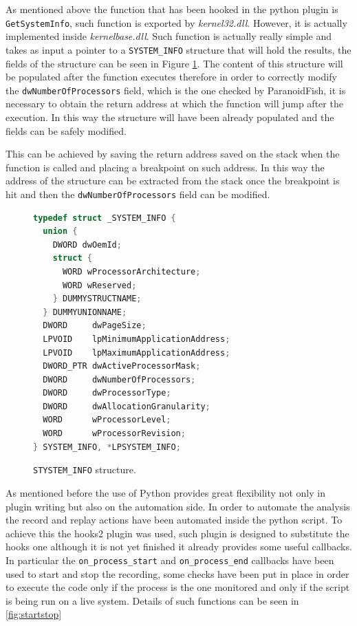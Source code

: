 As mentioned above the function that has been hooked in the python plugin is \lstinline{GetSystemInfo}, such function is exported by \textit{kernel32.dll}. However, it is actually implemented inside \textit{kernelbase.dll}. Such function is actually really simple and takes as input a pointer to a \lstinline{SYSTEM_INFO} structure that will hold the results, the fields of the structure can be seen in Figure \ref{fig:sysinfo}. The content of this structure will be populated after the function executes therefore in order to correctly modify the \lstinline{dwNumberOfProcessors} field, which is the one checked by ParanoidFish, it is necessary to obtain the return address at which the function will jump after the execution. In this way the structure will have been already populated and the fields can be safely modified.

This can be achieved by saving the return address saved on the stack when the function is called and placing a breakpoint on such address. In this way the address of the structure can be extracted from the stack once the breakpoint is hit and then the \lstinline{dwNumberOfProcessors} field can be modified.  

\begin{figure}[htp]
\centering
\begin{lstlisting}[language=C++] 
typedef struct _SYSTEM_INFO {
  union {
    DWORD dwOemId;
    struct {
      WORD wProcessorArchitecture;
      WORD wReserved;
    } DUMMYSTRUCTNAME;
  } DUMMYUNIONNAME;
  DWORD     dwPageSize;
  LPVOID    lpMinimumApplicationAddress;
  LPVOID    lpMaximumApplicationAddress;
  DWORD_PTR dwActiveProcessorMask;
  DWORD     dwNumberOfProcessors;
  DWORD     dwProcessorType;
  DWORD     dwAllocationGranularity;
  WORD      wProcessorLevel;
  WORD      wProcessorRevision;
} SYSTEM_INFO, *LPSYSTEM_INFO;
\end{lstlisting}
\caption{\lstinline{STYSTEM_INFO} structure.}
\label{fig:sysinfo}
\end{figure}

As mentioned before the use of Python provides great flexibility not only in plugin writing but also on the automation side. In order to automate the analysis the record and replay actions have been automated inside the python script. To achieve this the hooks2 plugin was used, such plugin is designed to substitute the hooks one although it is not yet finished it already provides some useful callbacks. In particular the \lstinline{on_process_start} and \lstinline{on_process_end} callbacks have been used to start and stop the recording, some checks have been put in place in order to execute the code only if the process is the one monitored and only if the script is being run on a live system. Details of such functions can be seen in \ref{fig:startstop}

